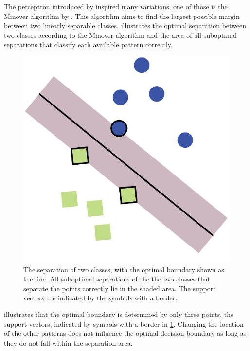 The perceptron introduced by \citeauthor{rosenblatt1958perceptron} inspired many variations, one of those is the Minover algorithm by \citeauthor{krauth1987learning}. This algorithm aims to find the largest possible margin between two linearly separable classes.  illustrates the optimal separation between two classes according to the Minover algorithm and the area of all suboptimal separations that classify each available pattern correctly. 

\begin{figure}[H]
	\centering
	\includegraphics[width=0.8\columnwidth]{./img/optimalboundary-01}
	\caption{The separation of two classes, with the optimal boundary shown as the line. All suboptimal separations of the the two classes that separate the points correctly lie in the shaded area. The support vectors are indicated by the symbols with a border.}
	\label{fig:1:optimalSolution}
\end{figure}

 illustrates that the optimal boundary is determined by only three points, the support vectors, indicated by symbols with a border in \cref{fig:1:optimalSolution}. Changing the location of the other patterns does not influence the optimal decision boundary as long as they do not fall within the separation area.

